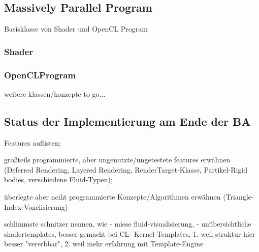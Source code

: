 \subsection{Massively Parallel Program}
	Basisklasse von Shader und OpenCL Program
	\subsubsection{Shader}
		
	\subsubsection{OpenCLProgram}

weitere klassen/konzepte to go...	


\subsection{Status der Implementierung am Ende der BA}
	
	Features auflisten;

	großteils programmierte, aber ungenutzte/ungetestete features erwähnen (Deferred Rendering, Layered Rendering, 	
	RenderTarget-Klasse, Partikel-Rigid bodies, verschiedene Fluid-Typen); 


	überlegte aber nciht programmierte Konzepte/Algorithmen erwähnen (Triangle-Index-Voxelisierung)
	
	schlimmste schnitzer nennen, wie
		- miese fluid-visualisierung, 
		- unübersichtliche shadertemplates, besser gemacht bei CL-
			Kernel-Templates, 1. weil struktur hier besser "vererbbar", 2. weil mehr erfahrung mit  Template-Engine
	
	  	
  	

\clearpage
